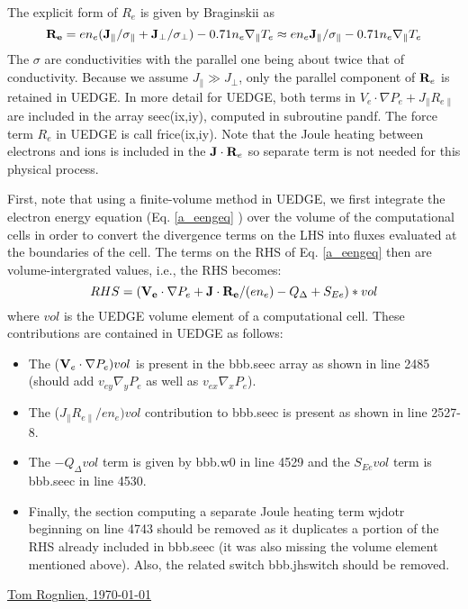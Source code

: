\documentclass [11pt]{article}
\begin{document}
The explicit form of $R_e$  is given by Braginskii as
\begin{equation}
    {\bf R_e} = en_e({\bf J}_{\parallel}/\sigma_{\parallel} + {\bf J}_\perp/\sigma_\perp) - 
    0.71 n_e \nabla_\parallel T_e \approx en_e{\bf J}_{\parallel}/\sigma_{\parallel} -0.71 n_e \nabla_\parallel T_e
\end{equation}
The $\sigma$ are conductivities with the parallel one being about twice that of conductivity.  Because
we assume $J_\parallel \gg J_\perp$, only the parallel component of ${\bf R}_e$ is retained in UEDGE.
In more detail for UEDGE, both terms in $V_e \cdot \nabla P_e + J_\parallel R_{e\parallel}$ are included
in the array seec(ix,iy), computed in subroutine pandf.  The force term $R_e$ in UEDGE is call frice(ix,iy).
Note that the Joule heating between electrons and ions is included in the ${\bf J} \cdot {\bf R}_e$ so separate term is not needed for this physical process.

%
First, note that using a finite-volume method in UEDGE, we first integrate the electron energy equation (Eq. \ref{a_eengeq} ) over the volume of the computational cells in order to convert the divergence terms on the LHS into fluxes evaluated at the boundaries of the cell.  The terms on the RHS of Eq. \ref{a_eengeq} then are volume-intergrated values, i.e., the RHS becomes:
%
\begin{equation}
    RHS = ({\bf V_e} \cdot \nabla P_e + {\bf J} \cdot {\bf R_e}/(en_e) - Q_\Delta + S_{Ee})*vol 
\end{equation}
where $vol$ is the UEDGE volume element of a computational cell.  These contributions are contained in UEDGE as follows:

\begin{itemize}
\item The (${\bf V}_e \cdot \nabla P_e) vol$ is present in the bbb.seec array as shown in line 2485 (should add $v_{ey} \nabla_y P_e$ as well as $v_{ex} \nabla_x P_e$).

\item The ($J_\parallel R_{e\parallel}/en_e) vol$ contribution to bbb.seec is present as shown in line 2527-8.

\item The $- Q_\Delta vol$ term is given by bbb.w0 in line 4529 and the $S_{Ee} vol$ term is bbb.seec in line 4530.

\item Finally, the section computing a separate Joule heating term wjdotr beginning on line 4743 should be removed  as it duplicates a portion of the RHS already included in bbb.seec (it was also missing the volume element mentioned above). Also, the related switch bbb.jhswitch should be removed.
\end{itemize}

\underline{Tom Rognlien, \today}
\end{document}
